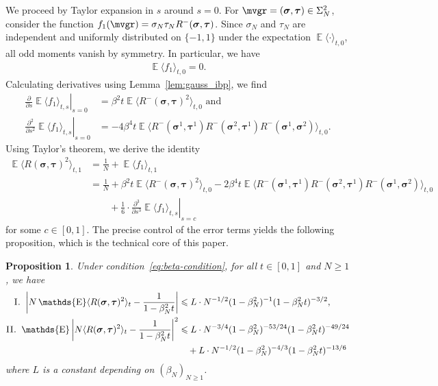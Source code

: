 \documentclass[letterpaper,11pt,reqno]{amsart}
\newtheorem{prop}[thm]{Proposition}
\renewcommand{\leq}{\leqslant}
\renewcommand{\geq}{\geqslant}
\newcommand{\ra}{\rangle}
\newcommand{\la}{\langle}
\newcommand{\abs}[1]{\left\vert#1\right\vert}
\newcommand{\mvgs}{\boldsymbol{\sigma}}\newcommand{\mvgS}{\boldsymbol{\Sigma}}\newcommand{\mvgt}{\boldsymbol{\tau}}
\DeclareMathOperator{\E}{\mathds{E}}
\begin{document}
We proceed by Taylor expansion in $s$ around $s=0$. For \(\mvgr = (\mvgs, \mvgt) \in \Sigma_{N}^2\), consider the function 
\(f_1 (\mvgr) = \sigma_N \tau_N R^- (\mvgs, \mvgt) \).
Since $\sigma_N$ and $\tau_N$ are independent and uniformly distributed on \(\{-1,1\}\) under the expectation \(\E \la \cdot \ra_{t,0}\), all odd moments vanish by symmetry. In particular, we have
\begin{align*}
    \E \la f_1 \ra_{t,0} = 0.
\end{align*}
Calculating derivatives using Lemma~\ref{lem:gauss_ibp}, we find
\begin{align*}
    \left. \frac{\partial}{\partial s} \E \la f_1 \ra_{t,s} \right|_{s=0} 
    &= \beta^2 t \E\la R^-(\mvgs, \mvgt)^2 \ra_{t,0} \text{ and }\\
    \left. \frac{\partial^2}{\partial s^2} \E \la f_1 \ra_{t,s} \right|_{s=0} 
    &= - 4 \beta^4 t \E\la R^-(\mvgs^1, \mvgt^1) R^-(\mvgs^2, \mvgt^1) R^-(\mvgs^1, \mvgs^2) \ra_{t,0}.
\end{align*}
Using Taylor's theorem, we derive the identity
\begin{align}
    \E \la R(\mvgs, \mvgt)^2\ra_{t,1} 
    &= \frac{1}{N} + \E \la f_1 \ra_{t,1} \nonumber \\
    &= \frac{1}{N} + \beta^2 t \E\la R^-(\mvgs, \mvgt)^2 \ra_{t,0} - 2 \beta^4 t \E\la R^-(\mvgs^1, \mvgt^1) R^-(\mvgs^2, \mvgt^1) R^-(\mvgs^1, \mvgs^2) \ra_{t,0} \nonumber \\
    &\qquad + \frac{1}{6} \cdot \left. \frac{\partial^3}{\partial s^3} \E \la f_1 \ra_{t,s} \right|_{s=c}
    \label{eq:main}
\end{align}
for some \(c \in [0,1]\).
The precise control of the error terms yields the following proposition, which is the technical core of this paper.

\begin{prop}\label{prop:R^2 main estimate}
    Under condition~\eqref{eq:beta-condition}, for all \(t \in [0,1]\) and \(N \geq 1\), we have
    \begin{align}
        \textsc{I. } \abs{ N \E \la R(\mvgs, \mvgt)^2\ra_{t} - \frac{1}{1-\beta_N^2 t} }
        &\leq L \cdot N^{-1/2} (1-\beta_N^2)^{-1} (1-\beta_N^2 t)^{-3/2},\label{eq:prop1}\\
         \textsc{II. }  \E \abs{N \la R(\mvgs, \mvgt)^2 \ra_{t} - \frac{1}{1-\beta_N^2 t} }^2
        &\leq L \cdot N^{-3/4} (1-\beta_N^2)^{-53/24}(1-\beta_N^2 t)^{-49/24} \nonumber \\
        &\quad + L \cdot N^{-1/2} (1-\beta_N^2)^{-4/3}(1-\beta_N^2 t)^{-13/6} \label{eq:prop2}
    \end{align}
    where \(L\) is a constant depending on \((\beta_N)_{N\geq 1}\).
\end{prop}
\end{document}

